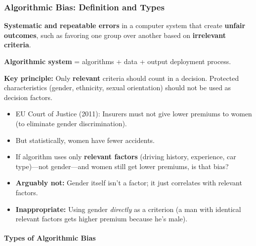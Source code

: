 \bigseparator

\subsubsection{Algorithmic Bias: Definition and Types}

\begin{defbox}
\textbf{Systematic and repeatable errors} in a computer system that create \textbf{unfair outcomes}, such as favoring one group over another based on \textbf{irrelevant criteria}.

\textbf{Algorithmic system} = algorithms + data + output deployment process.

\textbf{Key principle:} Only \textbf{relevant} criteria should count in a decision. Protected characteristics (gender, ethnicity, sexual orientation) should not be used as decision factors.
\end{defbox}

\begin{exbox}
\begin{itemize}
  \item EU Court of Justice (2011): Insurers must not give lower premiums to women (to eliminate gender discrimination).
  \item But statistically, women have fewer accidents.
  \item If algorithm uses only \textbf{relevant factors} (driving history, experience, car type)---not gender---and women still get lower premiums, is that bias?
  \item \textbf{Arguably not:} Gender itself isn't a factor; it just correlates with relevant factors.
  \item \textbf{Inappropriate:} Using gender \textit{directly} as a criterion (a man with identical relevant factors gets higher premium because he's male).
\end{itemize}
\end{exbox}

\separator

\paragraph*{Types of Algorithmic Bias}

